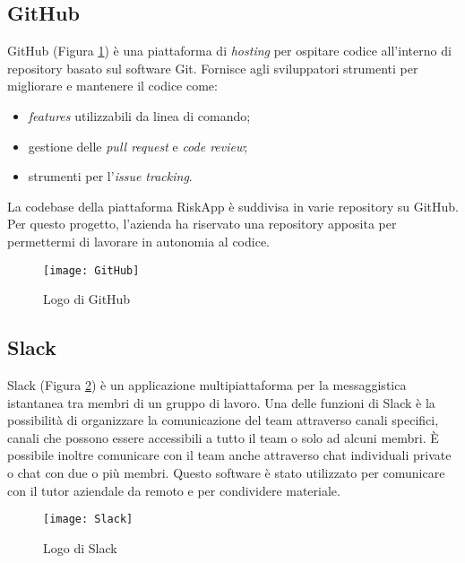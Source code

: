 \subsection{GitHub}
GitHub (Figura \ref{fig:github}) è una piattaforma di \emph{hosting} per ospitare codice all'interno di repository basato sul software Git.\newline
Fornisce agli sviluppatori strumenti per migliorare e mantenere il codice come:
\begin{itemize}
    \item \emph{features} utilizzabili da linea di comando;
    \item gestione delle \emph{pull request} e \emph{code review};
    \item strumenti per l’\emph{issue tracking}.
\end{itemize}
La codebase della piattaforma RiskApp è suddivisa in varie repository su GitHub.\newline
Per questo progetto, l'azienda ha riservato una repository apposita per permettermi di lavorare in autonomia al codice.\newline
\begin{figure}[!h] 
    \centering 
    \texttt{[image: GitHub]} 
    \caption{Logo di GitHub}\label{fig:github}
\end{figure}

\newpage

\subsection{Slack}
Slack (Figura \ref{fig:slack}) è un applicazione multipiattaforma per la messaggistica istantanea tra membri di un gruppo di lavoro.\newline
Una delle funzioni di Slack è la possibilità di organizzare la comunicazione del team attraverso canali specifici, canali che possono essere accessibili a tutto il team o solo ad alcuni membri.\newline
È possibile inoltre comunicare con il team anche attraverso chat individuali private o chat con due o più membri.\newline
Questo software è stato utilizzato per comunicare con il tutor aziendale da remoto e per condividere materiale.\newline
\begin{figure}[!h] 
    \centering 
    \texttt{[image: Slack]} 
    \caption{Logo di Slack}\label{fig:slack}
\end{figure}


